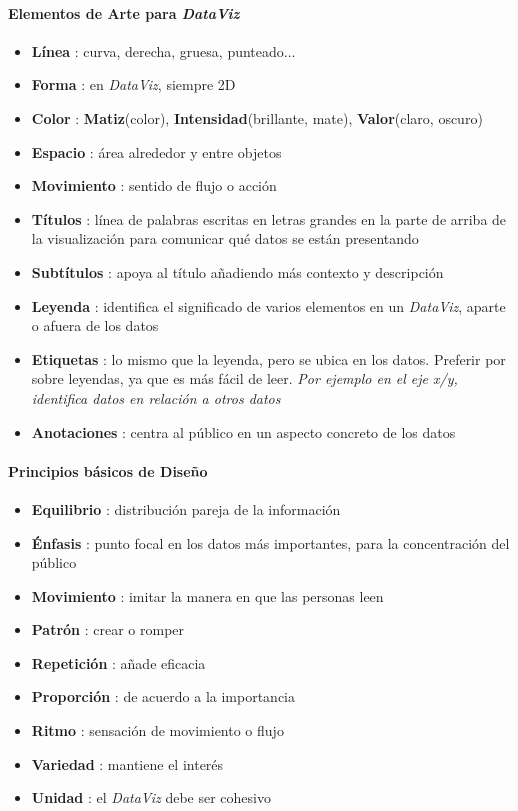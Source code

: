 \paragraph{Elementos de Arte para \textit{DataViz}}
\begin{itemize}
    \item {\textbf{Línea} : curva, derecha, gruesa, punteado...}
    \item {\textbf{Forma} : en \textit{DataViz}, siempre 2D}
    \item {\textbf{Color} : \textbf{Matiz}(color), \textbf{Intensidad}(brillante, mate), \textbf{Valor}(claro, oscuro)}
    \item {\textbf{Espacio} : área alrededor y entre objetos}
    \item {\textbf{Movimiento} : sentido de flujo o acción}
    \item {\textbf{Títulos} : línea de palabras escritas en letras grandes en la parte de arriba de la visualización para comunicar qué datos se están presentando}
    \item {\textbf{Subtítulos} : apoya al título añadiendo más contexto y descripción}
    \item {\textbf{Leyenda} : identifica el significado de varios elementos en un \textit{DataViz}, aparte o afuera de los datos}
    \item {\textbf{Etiquetas} : lo mismo que la leyenda, pero se ubica en los datos. Preferir por sobre leyendas, ya que es más fácil de leer. \textit{Por ejemplo en el eje x/y, identifica datos en relación a otros datos}}
    \item {\textbf{Anotaciones} : centra al público en un aspecto concreto de los datos}
\end{itemize}

\paragraph{Principios básicos de Diseño}
\begin{itemize}
    \item {\textbf{Equilibrio} : distribución pareja de la información}
    \item {\textbf{Énfasis} : punto focal en los datos más importantes, para la concentración del público}
    \item {\textbf{Movimiento} : imitar la manera en que las personas leen}
    \item {\textbf{Patrón} : crear o romper}
    \item {\textbf{Repetición} : añade eficacia}
    \item {\textbf{Proporción} : de acuerdo a la importancia}
    \item {\textbf{Ritmo} : sensación de movimiento o flujo}
    \item {\textbf{Variedad} : mantiene el interés}
    \item {\textbf{Unidad} : el \textit{DataViz} debe ser cohesivo}
\end{itemize}

